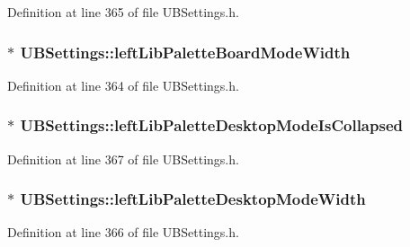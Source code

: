 Definition at line 365 of file U\-B\-Settings.\-h.

\hypertarget{class_u_b_settings_a3a4a5e502951a3bde57cca8bdb5736cb}{
\subsubsection[{left\-Lib\-Palette\-Board\-Mode\-Width}]{$\ast$ U\-B\-Settings\-::left\-Lib\-Palette\-Board\-Mode\-Width}}\label{db/d66/class_u_b_settings_a3a4a5e502951a3bde57cca8bdb5736cb}


Definition at line 364 of file U\-B\-Settings.\-h.

\hypertarget{class_u_b_settings_a048c958d7f12527c6f1d4017cb6fb5a6}{
\subsubsection[{left\-Lib\-Palette\-Desktop\-Mode\-Is\-Collapsed}]{$\ast$ U\-B\-Settings\-::left\-Lib\-Palette\-Desktop\-Mode\-Is\-Collapsed}}\label{db/d66/class_u_b_settings_a048c958d7f12527c6f1d4017cb6fb5a6}


Definition at line 367 of file U\-B\-Settings.\-h.

\hypertarget{class_u_b_settings_a956d853b5bc1decb27572fb1b92681fd}{
\subsubsection[{left\-Lib\-Palette\-Desktop\-Mode\-Width}]{$\ast$ U\-B\-Settings\-::left\-Lib\-Palette\-Desktop\-Mode\-Width}}\label{db/d66/class_u_b_settings_a956d853b5bc1decb27572fb1b92681fd}


Definition at line 366 of file U\-B\-Settings.\-h.

